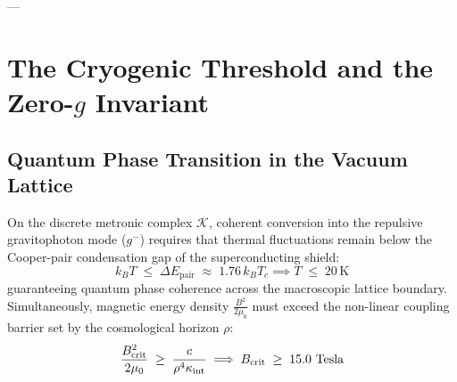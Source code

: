 \documentclass[
    12pt,
    a4paper,
    headings=normal,
    twoside=false,
    open=any,
    parskip=half
]{scrbook}
\let\hbar\relax
\begin{document}
---

\section{The Cryogenic Threshold and the Zero-$g$ Invariant}
\label{sec:ch6_hauser_droscher_propulsion_threshold}

\subsection{Quantum Phase Transition in the Vacuum Lattice}

On the discrete metronic complex $\mathcal{K}$, coherent conversion into the repulsive gravitophoton mode ($g^-$) requires that thermal fluctuations remain below the Cooper-pair condensation gap of the superconducting shield:
\begin{equation}
k_B T \;\le\; \Delta E_{\text{pair}} \;\approx\; 1.76 \, k_B T_c \implies T \;\le\; 20 \, \text{K}
\label{eq:ch6_temperature_threshold}
\end{equation}
guaranteeing quantum phase coherence across the macroscopic lattice boundary.
Simultaneously, magnetic energy density $\frac{B^2}{2\mu_0}$ must exceed the non-linear coupling barrier set by the cosmological horizon $\rho$:
\begin{equation}
\frac{B_{\text{crit}}^2}{2\mu_0} \;\ge\; \frac{\hbar c}{\rho^4 \kappa_{\text{int}}} \implies B_{\text{crit}} \;\ge\; 15.0 \text{ Tesla}
\label{eq:ch6_magnetic_field_threshold}
\end{equation}
\end{document}
